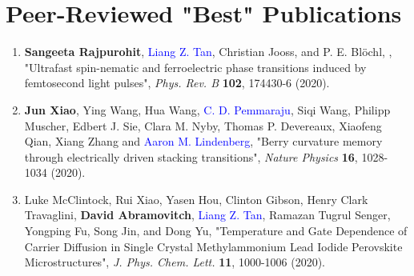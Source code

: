 \section{Peer-Reviewed "Best" Publications}

\begin{enumerate}
    \item  {\bf Sangeeta Rajpurohit}, \textcolor{blue}{Liang Z. Tan},  Christian Jooss, and P. E. Bl\"ochl, , "Ultrafast spin-nematic and ferroelectric phase transitions induced by femtosecond light pulses", {\it Phys. Rev. B} {\bf 102}, 174430-6 (2020). 

    
    \item {\bf Jun Xiao}, Ying Wang, Hua Wang, \textcolor{blue}{C. D. Pemmaraju}, Siqi Wang, Philipp Muscher, Edbert J. Sie, Clara M. Nyby, Thomas P. Devereaux, Xiaofeng Qian, Xiang Zhang and \textcolor{blue}{Aaron M. Lindenberg}, "Berry curvature memory through electrically driven stacking transitions", {\it Nature Physics} {\bf 16}, 1028-1034 (2020).

    \item  Luke McClintock, Rui Xiao, Yasen Hou, Clinton Gibson, Henry Clark Travaglini, {\bf David Abramovitch}, \textcolor{blue}{Liang Z. Tan}, Ramazan Tugrul Senger, Yongping Fu, Song Jin, and Dong Yu, "Temperature and Gate Dependence of Carrier Diffusion in Single Crystal Methylammonium Lead Iodide Perovskite Microstructures", {\it J. Phys. Chem. Lett.} {\bf 11}, 1000-1006 (2020). 
    
\end{enumerate}

\label{sec:appendix3}
